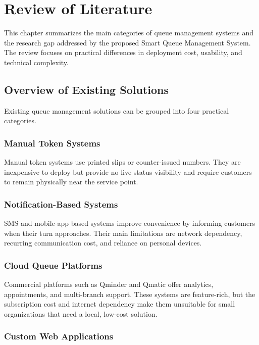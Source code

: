 
\chapter{Review of Literature}

This chapter summarizes the main categories of queue management systems and the research gap addressed by the proposed Smart Queue Management System. The review focuses on practical differences in deployment cost, usability, and technical complexity.

\section{Overview of Existing Solutions}

Existing queue management solutions can be grouped into four practical categories.

\subsection{Manual Token Systems}

Manual token systems use printed slips or counter-issued numbers. They are inexpensive to deploy but provide no live status visibility and require customers to remain physically near the service point.

\subsection{Notification-Based Systems}

SMS and mobile-app based systems improve convenience by informing customers when their turn approaches. Their main limitations are network dependency, recurring communication cost, and reliance on personal devices.

\subsection{Cloud Queue Platforms}

Commercial platforms such as Qminder and Qmatic offer analytics, appointments, and multi-branch support. These systems are feature-rich, but the subscription cost and internet dependency make them unsuitable for small organizations that need a local, low-cost solution.

\subsection{Custom Web Applications}

